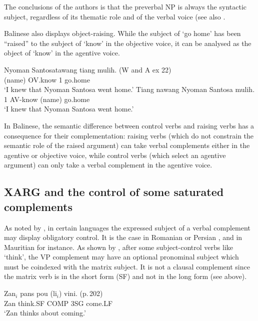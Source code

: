\documentclass[output=paper]{langsci/langscibook}
\begin{document}
The conclusions of the authors is that the preverbal NP is always the syntactic subject, regardless of its thematic role and of the verbal voice (see also \citealt{ManningandSag1998}.

Balinese also displays object-raising. While the subject of `go home' has been ``raised'' to the
subject of `know' in the objective voice, it can be analysed as the object of `know' in the agentive
voice.

\begin{exe}
\ex \begin{xlist}
\ex 
\gll Nyoman Santosatawang tiang mulih. (W and A ex 22)\\
     (name) OV.know       1 go.home\\
\glt `I knew that Nyoman Santosa went home.'
\ex \gll Tiang nawang Nyoman Santosa mulih.\\
         1 AV-know (name) {} go.home\\
\glt `I knew that Nyoman Santosa went home.'
\end{xlist}
\end{exe}

In Balinese, the semantic difference between control verbs and raising verbs has a consequence for their complementation: raising verbs (which do not constrain the semantic role of the raised argument) can take verbal complements either in the agentive or objective voice, while control verbs (which select an agentive argument) can only take a verbal complement in the agentive voice.

\subsection{XARG and the control of some saturated complements}

As noted by \citet{Farkas1988}, in certain languages the expressed subject of a verbal complement may display obligatory control. It is the case in Romanian or Persian \citet{Karimi2008}, and in Mauritian for instance. As shown by \citet{HenriandLaurens2011}, after some subject-control verbs like `think', the VP complement may have an optional pronominal subject which must be coindexed with the matrix subject. It is not a clausal complement since the matrix verb is in the short form (SF) and not in the long form (see above).

\begin{exe}
\ex \gll Zan$_{i}$ pans pou (li$_{i}$) vini. (p.\,202)\\
Zan think.SF COMP 3SG come.LF  \\
 \glt `Zan thinks about coming.'
\end{exe}
\end{document}
